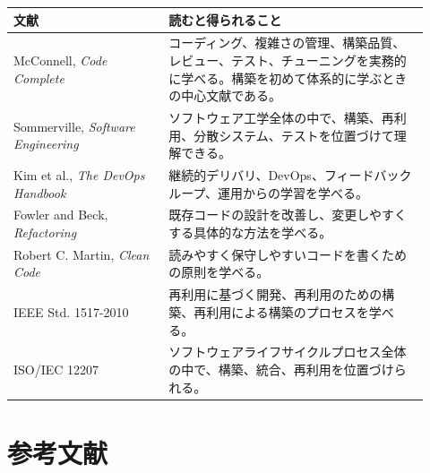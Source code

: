 \documentclass[a4paper,11pt,ja=standard,xelatex]{bxjsarticle}
\begin{document}
\begin{longtable}{L{0.34\linewidth}L{0.58\linewidth}}
\toprule
\textbf{文献} & \textbf{読むと得られること} \\
\midrule
McConnell, \textit{Code Complete} & コーディング、複雑さの管理、構築品質、レビュー、テスト、チューニングを実務的に学べる。構築を初めて体系的に学ぶときの中心文献である。 \\
Sommerville, \textit{Software Engineering} & ソフトウェア工学全体の中で、構築、再利用、分散システム、テストを位置づけて理解できる。 \\
Kim et al., \textit{The DevOps Handbook} & 継続的デリバリ、DevOps、フィードバックループ、運用からの学習を学べる。 \\
Fowler and Beck, \textit{Refactoring} & 既存コードの設計を改善し、変更しやすくする具体的な方法を学べる。 \\
Robert C. Martin, \textit{Clean Code} & 読みやすく保守しやすいコードを書くための原則を学べる。 \\
IEEE Std. 1517-2010 & 再利用に基づく開発、再利用のための構築、再利用による構築のプロセスを学べる。 \\
ISO/IEC 12207 & ソフトウェアライフサイクルプロセス全体の中で、構築、統合、再利用を位置づけられる。 \\
\bottomrule
\end{longtable}

\section{参考文献}
\end{document}
